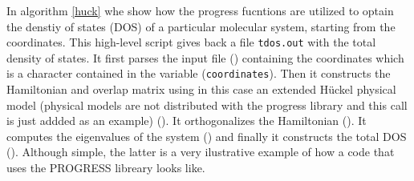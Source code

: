 In algorithm \ref{huck} whe show how the progress fucntions are utilized to optain the denstiy of states (DOS) of a particular molecular system, starting from the coordinates. 
This high-level script gives back a file \verb!tdos.out! with the total density of states. It first parses the input file () containing the coordinates which is a character contained in the variable (\verb!coordinates!). Then it constructs the Hamiltonian and overlap matrix using in this case an extended H\"{u}ckel physical model (physical models are not distributed with the progress library and this call is just addded as an example) (). It orthogonalizes the Hamiltonian (). It computes the eigenvalues of the system () and finally it constructs the total DOS (). Although simple, the latter is a very ilustrative example of how a code that uses the PROGRESS libreary looks like. 

